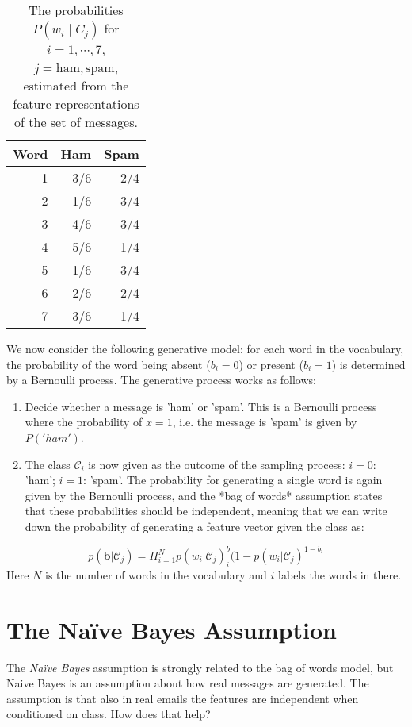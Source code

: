 \begin{table}
  \begin{center}
  \begin{tabular}{|r|r|r|} \hline
 Word & Ham & Spam  \\ \hline
 1    & 3/6 & 2/4  \\
 2    & 1/6 & 3/4  \\
 3    & 4/6 & 3/4  \\
 4    & 5/6 & 1/4  \\
 5    & 1/6 & 3/4  \\
 6    & 2/6 & 2/4  \\
 7    & 3/6 & 1/4  \\ \hline
  \end{tabular}
  \end{center}
  \caption{The probabilities $P(w_i \mid C_j)$ for $i= 1, \cdots, 7$, $j = \mbox{ham}, \mbox{spam}$, estimated from the feature representations of the set of messages.}
  \label{tab-wc}
\end{table}
We now consider the following generative model: for each word in the vocabulary, the probability of the word being absent ($b_i = 0$) or present ($b_i = 1$) is determined by a Bernoulli process. The generative process works as follows:

\begin{enumerate}
\item Decide whether a message is 'ham' or 'spam'. This is a Bernoulli process where the probability of $x = 1$, i.e.
the message is 'spam' is given by $P('ham')$.
\item The class $\mathcal{C}_i$ is now given as the outcome of the sampling process: $i = 0$: 'ham'; $i = 1$: 'spam'. The probability for generating a single word is again given by the Bernoulli process, and the *bag of words* assumption states that these probabilities should be independent, meaning that we can write down the
probability of generating a feature vector given the class as:
\end{enumerate}
$$
p(\boldsymbol{b}| \mathcal{C}_j ) = \Pi^N_{i=1} p(w_i | \mathcal{C}_j )^b_i ( 1 - p( w_i | \mathcal{C}_j)^{1 - b_i}
$$
Here $N$ is the number of words in the vocabulary and $i$ labels the words in there.

\section{The Na\"ive Bayes Assumption}
The \emph{Na\"ive Bayes} assumption is strongly related to the bag of words model, but Naive Bayes is an assumption about how real messages are generated. The assumption is that also in real emails the features are independent when conditioned on class. How does that help?

